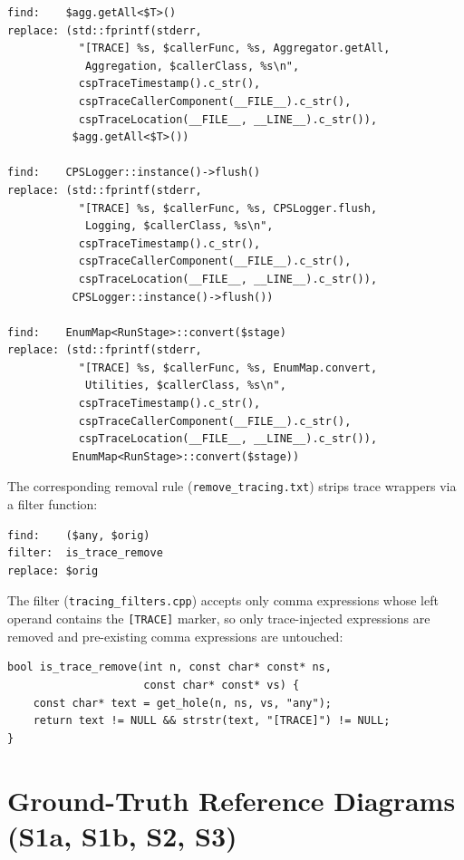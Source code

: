 \begin{verbatim}
find:    $agg.getAll<$T>()
replace: (std::fprintf(stderr,
           "[TRACE] %s, $callerFunc, %s, Aggregator.getAll,
            Aggregation, $callerClass, %s\n",
           cspTraceTimestamp().c_str(),
           cspTraceCallerComponent(__FILE__).c_str(),
           cspTraceLocation(__FILE__, __LINE__).c_str()),
          $agg.getAll<$T>())

find:    CPSLogger::instance()->flush()
replace: (std::fprintf(stderr,
           "[TRACE] %s, $callerFunc, %s, CPSLogger.flush,
            Logging, $callerClass, %s\n",
           cspTraceTimestamp().c_str(),
           cspTraceCallerComponent(__FILE__).c_str(),
           cspTraceLocation(__FILE__, __LINE__).c_str()),
          CPSLogger::instance()->flush())

find:    EnumMap<RunStage>::convert($stage)
replace: (std::fprintf(stderr,
           "[TRACE] %s, $callerFunc, %s, EnumMap.convert,
            Utilities, $callerClass, %s\n",
           cspTraceTimestamp().c_str(),
           cspTraceCallerComponent(__FILE__).c_str(),
           cspTraceLocation(__FILE__, __LINE__).c_str()),
          EnumMap<RunStage>::convert($stage))
\end{verbatim}

The corresponding removal rule (\texttt{remove\_tracing.txt}) strips
trace wrappers via a filter function:

\begin{verbatim}
find:    ($any, $orig)
filter:  is_trace_remove
replace: $orig
\end{verbatim}

The filter (\texttt{tracing\_filters.cpp}) accepts only comma
expressions whose left operand contains the \texttt{[TRACE]} marker, so
only trace-injected expressions are removed and pre-existing comma
expressions are untouched:

\begin{verbatim}
bool is_trace_remove(int n, const char* const* ns,
                     const char* const* vs) {
    const char* text = get_hole(n, ns, vs, "any");
    return text != NULL && strstr(text, "[TRACE]") != NULL;
}
\end{verbatim}

\section{Ground-Truth Reference Diagrams (S1a, S1b, S2, S3)}
\label{sec:appendix-groundtruth}

